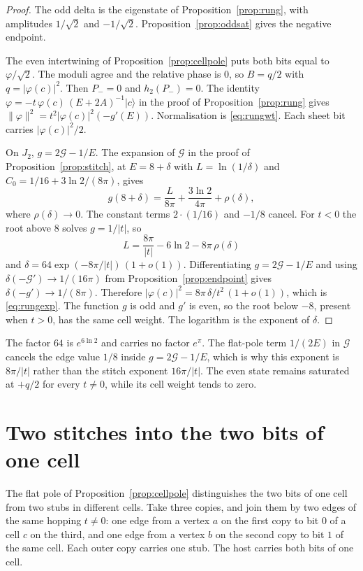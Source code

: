 \begin{proof}
The odd delta is the eigenstate of Proposition~\ref{prop:rung}, with
amplitudes \(1/\sqrt{2}\) and \(-1/\sqrt{2}\).
Proposition~\ref{prop:oddsat} gives the negative endpoint.

The even intertwining of Proposition~\ref{prop:cellpole} puts both bits
equal to \(\varphi/\sqrt{2}\).
The moduli agree and the relative phase is \(0\), so
\(B=q/2\) with \(q=|\varphi(c)|^2\).
Then \(P_-=0\) and \(h_2(P_-)=0\).
The identity \(\varphi=-t\,\varphi(c)\,(E+2A)^{-1}|c\rangle\) in the proof of
Proposition~\ref{prop:rung} gives
\(\|\varphi\|^2=t^2|\varphi(c)|^2(-g'(E))\).
Normalisation is \eqref{eq:rungwt}.
Each sheet bit carries \(|\varphi(c)|^2/2\).

On \(J_2\), \(g=2\mathcal{G}-1/E\).
The expansion of \(\mathcal{G}\) in the proof of
Proposition~\ref{prop:stitch}, at \(E=8+\delta\) with \(L=\ln(1/\delta)\) and
\(C_0=1/16+3\ln 2/(8\pi)\), gives
\[
g(8+\delta)
=\frac{L}{8\pi}+\frac{3\ln 2}{4\pi}+\rho(\delta),
\]
where \(\rho(\delta)\to 0\).
The constant terms \(2\cdot(1/16)\) and \(-1/8\) cancel.
For \(t<0\) the root above \(8\) solves \(g=1/|t|\), so
\[
L=\frac{8\pi}{|t|}-6\ln 2-8\pi\,\rho(\delta)
\]
and \(\delta=64\exp(-8\pi/|t|)\,(1+o(1))\).
Differentiating \(g=2\mathcal{G}-1/E\) and using
\(\delta(-\mathcal{G}')\to 1/(16\pi)\) from
Proposition~\ref{prop:endpoint} gives
\(\delta(-g')\to 1/(8\pi)\).
Therefore
\(|\varphi(c)|^2=8\pi\,\delta/t^2\,(1+o(1))\),
which is \eqref{eq:rungexp}.
The function \(g\) is odd and \(g'\) is even, so the root below \(-8\),
present when \(t>0\), has the same cell weight.
The logarithm is the exponent of \(\delta\).
\end{proof}

The factor \(64\) is \(e^{6\ln 2}\) and carries no factor \(e^{\pi}\).
The flat-pole term \(1/(2E)\) in \(\mathcal{G}\) cancels the edge value
\(1/8\) inside \(g=2\mathcal{G}-1/E\), which is why this exponent is
\(8\pi/|t|\) rather than the stitch exponent \(16\pi/|t|\).
The even state remains saturated at \(+q/2\) for every \(t\neq 0\), while
its cell weight tends to zero.

\section{Two stitches into the two bits of one cell}
\label{sec:twobit}

The flat pole of Proposition~\ref{prop:cellpole} distinguishes the two bits
of one cell from two stubs in different cells.
Take three copies, and join them by two edges of the same hopping \(t\neq 0\):
one edge from a vertex \(a\) on the first copy to bit \(0\) of a cell \(c\) on
the third, and one edge from a vertex \(b\) on the second copy to bit \(1\)
of the same cell.
Each outer copy carries one stub.
The host carries both bits of one cell.

